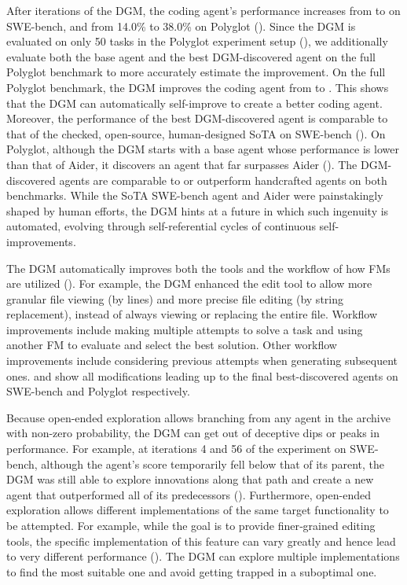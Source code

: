 After \DgmMainIterations{} iterations of the DGM, the coding agent's performance increases from \DgmSweBenchInitial{} to \DgmSweBenchFinal{} on SWE-bench, and from 14.0\% to 38.0\% on Polyglot (). Since the DGM is evaluated on only 50 tasks in the Polyglot experiment setup (), we additionally evaluate both the base agent and the best DGM-discovered agent on the full Polyglot benchmark to more accurately estimate the improvement. On the full Polyglot benchmark, the DGM improves the coding agent from \DgmPolyglotInitial{} to \DgmPolyglotFinal{}. This shows that the DGM can automatically self-improve to create a better coding agent. Moreover, the performance of the best DGM-discovered agent is comparable to that of the checked, open-source, human-designed SoTA on SWE-bench (). On Polyglot, although the DGM starts with a base agent whose performance is lower than that of Aider, it discovers an agent that far surpasses Aider (). The DGM-discovered agents are comparable to or outperform handcrafted agents on both benchmarks. While the SoTA SWE-bench agent and Aider were painstakingly shaped by human efforts, the DGM hints at a future in which such ingenuity is automated, evolving through self-referential cycles of continuous self-improvements.

The DGM automatically improves both the tools and the workflow of how FMs are utilized (). For example, the DGM enhanced the edit tool to allow more granular file viewing (by lines) and more precise file editing (by string replacement), instead of always viewing or replacing the entire file. Workflow improvements include making multiple attempts to solve a task and using another FM to evaluate and select the best solution. Other workflow improvements include considering previous attempts when generating subsequent ones.  and  show all modifications leading up to the final best-discovered agents on SWE-bench and Polyglot respectively.

Because open-ended exploration allows branching from any agent in the archive with non-zero probability, the DGM can get out of deceptive dips or peaks in performance. For example, at iterations 4 and 56 of the experiment on SWE-bench, although the agent's score temporarily fell below that of its parent, the DGM was still able to explore innovations along that path and create a new agent that outperformed all of its predecessors (). Furthermore, open-ended exploration allows different implementations of the same target functionality to be attempted. For example, while the goal is to provide finer‑grained editing tools, the specific implementation of this feature can vary greatly and hence lead to very different performance (). The DGM can explore multiple implementations to find the most suitable one and avoid getting trapped in a suboptimal one.

